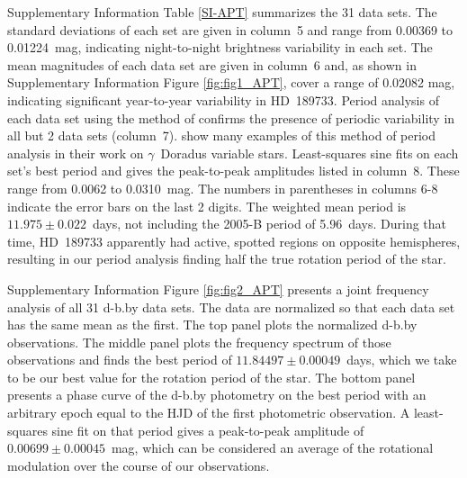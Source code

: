 \documentclass[sn-standardnature]{sn-jnl}%
\begin{document}
Supplementary Information Table \ref{SI-APT} summarizes the 31 data sets.  The standard deviations of each set are given in column~5 and range from 0.00369 to 0.01224~mag, indicating night-to-night brightness variability in each set.  The mean magnitudes of each data set are given in column~6 and, as shown in Supplementary Information Figure \ref{fig:fig1_APT}, cover a range of 0.02082 mag, indicating significant year-to-year variability in HD~189733.  Period analysis of each data set using the method of  confirms the presence of periodic variability in all but 2 data sets (column~7).   show many examples of this method of period analysis in their work on $\gamma$~Doradus variable stars.  Least-squares sine fits on each set's best period and gives the peak-to-peak amplitudes listed in column~8.  These range from 0.0062 to 0.0310~mag.  The numbers in parentheses in columns 6-8 indicate the error bars on the last 2 digits.  The weighted mean period is $11.975\pm0.022$~days, not including the 2005-B period of 5.96~days.  During that time, HD~189733 apparently had active, spotted regions on opposite hemispheres, resulting in our period analysis finding half the true rotation period of the star.




Supplementary Information Figure \ref{fig:fig2_APT} presents a joint frequency analysis of all 31 d-b.by data sets. The 
data are normalized so that each data set has the same mean as the first. The top panel plots the normalized d-b.by observations.  The middle panel plots the frequency spectrum of those observations and finds the best period of $11.84497\pm0.00049$~days, which we take to be our best value for the rotation period of the star.  The bottom panel presents a phase curve of the d-b.by photometry on the best period with an arbitrary epoch equal to the HJD of the first photometric observation.  A least-squares sine fit on that period gives a peak-to-peak amplitude of $0.00699\pm0.00045$~mag, which can be considered an average of the rotational modulation over the course of our observations.
\end{document}
